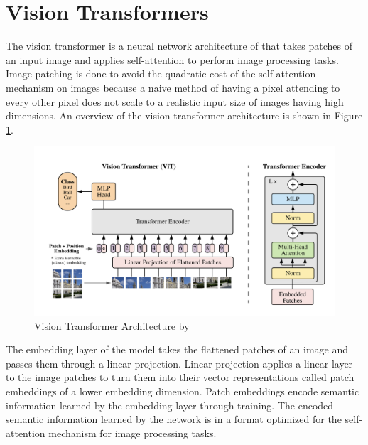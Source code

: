 

\section{Vision Transformers}

The vision transformer is a neural network architecture of \cite{dosovitskiy2021imageworth16x16words} that takes patches of an input image and applies self-attention to perform image processing tasks. Image patching is done to avoid the quadratic cost of the self-attention mechanism on images because a naive method of having a pixel attending to every other pixel does not scale to a realistic input size of images having high dimensions. An overview of the vision transformer architecture is shown in Figure \ref{fig:original-vit}.

\begin{figure}[H]
    \centering
    \includegraphics[height=0.5\linewidth]{images/VisionTransformer.png}
    \caption{Vision Transformer Architecture by \cite{dosovitskiy2021imageworth16x16words}}
    \label{fig:original-vit}
\end{figure}

The embedding layer of the model takes the flattened patches of an image and passes them through a linear projection. Linear projection applies a linear layer to the image patches to turn them into their vector representations called patch embeddings of a lower embedding dimension. Patch embeddings encode semantic information learned by the embedding layer through training. The encoded semantic information learned by the network is in a format optimized for the self-attention mechanism for image processing tasks.


